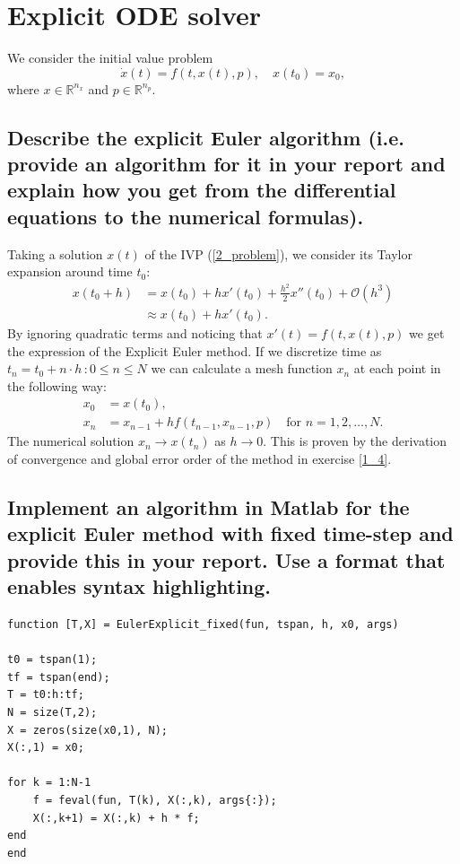 \section{Explicit ODE solver} \label{part2}
We consider the initial value problem
\begin{equation} \label{2_problem}
    \Dot{x}(t) = f(t,x(t),p), \hspace{1em} x(t_0) = x_0,
\end{equation}
where $x \in \mathbb{R}^{n_x}$ and $p \in \mathbb{R}^{n_p}$.

\subsection{Describe the explicit Euler algorithm (i.e. provide an algorithm for it in your report and explain how you get from the differential equations to the numerical formulas).}

Taking a solution $x(t)$ of the IVP (\ref{2_problem}), we consider its Taylor expansion around time $t_0$:
\begin{align*}
    x(t_0 + h) &= x(t_0) + hx'(t_0) + \frac{h^2}{2}x''(t_0) + \mathcal{O}(h^3) \\
    & \approx x(t_0) + hx'(t_0).
\end{align*}
By ignoring quadratic terms and noticing that $x'(t) = f(t, x(t), p)$ we get the expression of the Explicit Euler method. If we discretize time as $t_n = t_0 + n \cdot h \, : 0 \leq n \leq N$ we can calculate a mesh function $x_n$ at each point in the following way:
\begin{align*}
    x_0 &= x(t_0), \\
    x_n &= x_{n-1}  + h f(t_{n-1}, x_{n-1}, p) \hspace{1em} \text{for } n = 1, 2, \ldots, N.
\end{align*}
The numerical solution $x_n \to x(t_n)$ as $h \to 0$. This is proven by the derivation of convergence and global error order of the method in exercise \ref{1_4}.


\subsection{Implement an algorithm in Matlab for the explicit Euler method with fixed time-step and provide this in your report. Use a format that enables syntax highlighting.}
\begin{lstlisting}[caption = Explicit Euler method with fixed time step size, captionpos=b, label=2_ExEuler_fixed]
function [T,X] = EulerExplicit_fixed(fun, tspan, h, x0, args)

t0 = tspan(1);
tf = tspan(end);
T = t0:h:tf;
N = size(T,2);
X = zeros(size(x0,1), N);
X(:,1) = x0;

for k = 1:N-1
    f = feval(fun, T(k), X(:,k), args{:});
    X(:,k+1) = X(:,k) + h * f;
end
end

\end{lstlisting}

